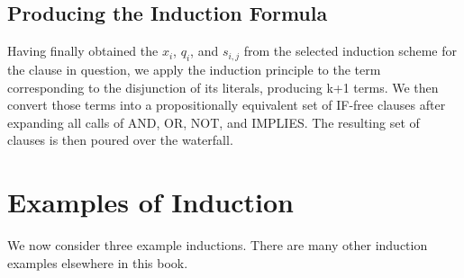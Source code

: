 \documentclass[11pt]{book}
\newcommand{\pubdefaulttextsize}{\large}
\begin{document}
\subsection{Producing the Induction Formula}
\pubdefaulttextsize
Having finally obtained the $x_{i}$, $q_{i}$, and $s_{i,j}$ from the
selected induction scheme for the clause in question, we apply the
induction principle to the term corresponding to the disjunction of
its literals, producing k+1 terms.  We then convert those terms
into a propositionally equivalent set of IF-free clauses after expanding all
calls of AND, OR, NOT, and IMPLIES.  The resulting set of clauses is then
poured over the waterfall.
\section{Examples of Induction}
\pubdefaulttextsize
We now consider three example inductions.  There are many
other induction examples elsewhere in this book.
\end{document}
